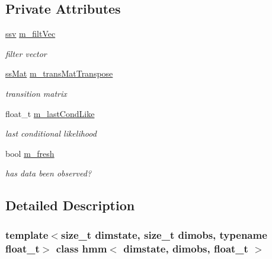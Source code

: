 \subsection*{Private Attributes}
\begin{DoxyCompactItemize}
\item 
\mbox{\label{classhmm_ab986d567358117debde35a1bf9063d1a}} 
\hyperlink{classcf__filter_ad4bce534d6b7a494dae851846037c94b}{ssv} \hyperlink{classhmm_ab986d567358117debde35a1bf9063d1a}{m\+\_\+filt\+Vec}
\begin{DoxyCompactList}\small\item\em filter vector \end{DoxyCompactList}\item 
\mbox{\label{classhmm_a95b1182114d3334585108a6a7e75c99d}} 
\hyperlink{classhmm_ab954b8e3fc86a60201ec33f371a241aa}{ss\+Mat} \hyperlink{classhmm_a95b1182114d3334585108a6a7e75c99d}{m\+\_\+trans\+Mat\+Transpose}
\begin{DoxyCompactList}\small\item\em transition matrix \end{DoxyCompactList}\item 
\mbox{\label{classhmm_a923bd361313fedb0a0a55bdb95cfbf07}} 
float\+\_\+t \hyperlink{classhmm_a923bd361313fedb0a0a55bdb95cfbf07}{m\+\_\+last\+Cond\+Like}
\begin{DoxyCompactList}\small\item\em last conditional likelihood \end{DoxyCompactList}\item 
\mbox{\label{classhmm_a0a209809aeeef9d4b5679ca6bb51e588}} 
bool \hyperlink{classhmm_a0a209809aeeef9d4b5679ca6bb51e588}{m\+\_\+fresh}
\begin{DoxyCompactList}\small\item\em has data been observed? \end{DoxyCompactList}\end{DoxyCompactItemize}


\subsection{Detailed Description}
\subsubsection*{template$<$size\+\_\+t dimstate, size\+\_\+t dimobs, typename float\+\_\+t$>$\newline
class hmm$<$ dimstate, dimobs, float\+\_\+t $>$}

